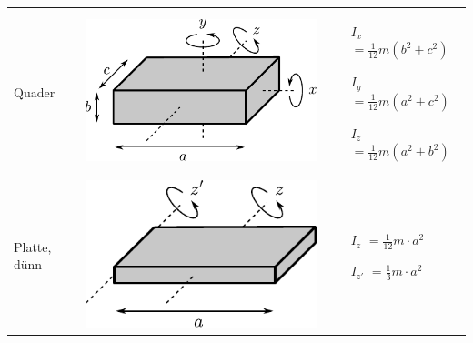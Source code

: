 \begin{table}[h!]
\begin{tabular}{m{2cm} c m{}}
Quader &
        \begin{minipage}{0.3\textwidth}
        \centering
        \includegraphics[scale=\traegscale]{../fig/traeg-quader.pdf}
        \end{minipage} &
                \begin{itemize}
                \item[$I_x$]$= \frac{1}{12} m \left(b^2 + c^2\right)$
                \item[$I_y$]$= \frac{1}{12} m \left(a^2 + c^2\right)$
                \item[$I_z$]$= \frac{1}{12} m \left(a^2 + b^2\right)$
                \end{itemize} \\
Platte, dünn &
        \begin{minipage}{0.3\textwidth}
        \includegraphics[scale=\traegscale]{../fig/traeg-platte.pdf}
        \end{minipage} &
                \begin{itemize}
                \item[$I_z$]$= \frac{1}{12} m \cdot a^2$
                \item[$I_{z'}$]$= \frac{1}{3} m \cdot a^2$
                \end{itemize} \\
\end{tabular}
\end{table}

